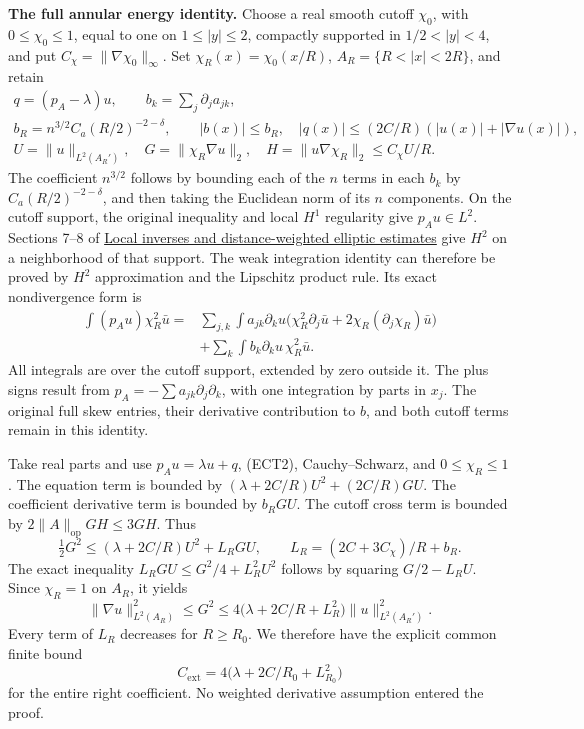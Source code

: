 \documentclass[
  11pt,
]{article}
\begin{document}
\textbf{The full annular energy identity.} Choose a real smooth cutoff
\(\chi_0\), with \(0\leq\chi_0\leq1\), equal to one on
\(1\leq|y|\leq2\), compactly supported in \(1/2<|y|<4\), and put
\(C_\chi=\|\nabla\chi_0\|_\infty\). Set \(\chi_R(x)=\chi_0(x/R)\),
\(A_R=\{R<|x|<2R\}\), and retain \[
 \begin{gathered}
 q=(p_A-\lambda)u,\qquad b_k=\sum_j\partial_j a_{jk},\\
 b_R=n^{3/2}C_a(R/2)^{-2-\delta},\qquad
 |b(x)|\leq b_R,\quad
 |q(x)|\leq(2C/R)(|u(x)|+|\nabla u(x)|),\\
 U=\|u\|_{L^2(A_R')},\quad
 G=\|\chi_R\nabla u\|_2,\quad
 H=\|u\nabla\chi_R\|_2\leq C_\chi U/R.
 \end{gathered}                                                   \tag{ECT3}
\] The coefficient \(n^{3/2}\) follows by bounding each of the \(n\)
terms in each \(b_k\) by \(C_a(R/2)^{-2-\delta}\), and then taking the
Euclidean norm of its \(n\) components. On the cutoff support, the
original inequality and local \(H^1\) regularity give \(p_Au\in L^2\).
Sections 7--8 of \href{local-elliptic-coefficients.pdf}{Local inverses
and distance-weighted elliptic estimates} give \(H^2\) on a neighborhood
of that support. The weak integration identity can therefore be proved
by \(H^2\) approximation and the Lipschitz product rule. Its exact
nondivergence form is \[
 \begin{split}
 \int(p_Au)\chi_R^2\bar u
 ={}&\sum_{j,k}\int a_{jk}\partial_k u
       \bigl(\chi_R^2\partial_j\bar u
              +2\chi_R(\partial_j\chi_R)\bar u\bigr)\\
 &+\sum_k\int b_k\partial_k u\,\chi_R^2\bar u.
 \end{split}                                                     \tag{ECT4}
\] All integrals are over the cutoff support, extended by zero outside
it. The plus signs result from \(p_A=-\sum a_{jk}\partial_j\partial_k\),
with one integration by parts in \(x_j\). The original full skew
entries, their derivative contribution to \(b\), and both cutoff terms
remain in this identity.

Take real parts and use \(p_Au=\lambda u+q\), (ECT2), Cauchy--Schwarz,
and \(0\leq\chi_R\leq1\). The equation term is bounded by
\((\lambda+2C/R)U^2+(2C/R)GU\). The coefficient derivative term is
bounded by \(b_RGU\). The cutoff cross term is bounded by
\(2\|A\|_{\mathrm{op}}GH\leq3GH\). Thus \[
 \tfrac12G^2\leq(\lambda+2C/R)U^2+L_RGU,
 \qquad L_R=(2C+3C_\chi)/R+b_R.
 \tag{ECT5}
\] The exact inequality \(L_RGU\leq G^2/4+L_R^2U^2\) follows by squaring
\(G/2-L_RU\). Since \(\chi_R=1\) on \(A_R\), it yields \[
 \|\nabla u\|_{L^2(A_R)}^2\leq G^2
 \leq4\bigl(\lambda+2C/R+L_R^2\bigr)
                    \|u\|_{L^2(A_R')}^2.
 \tag{ECT6}
\] Every term of \(L_R\) decreases for \(R\geq R_0\). We therefore have
the explicit common finite bound \[
 C_{\mathrm{ext}}=4\bigl(\lambda+2C/R_0+L_{R_0}^2\bigr)
 \tag{ECT7}
\] for the entire right coefficient. No weighted derivative assumption
entered the proof.
\end{document}
